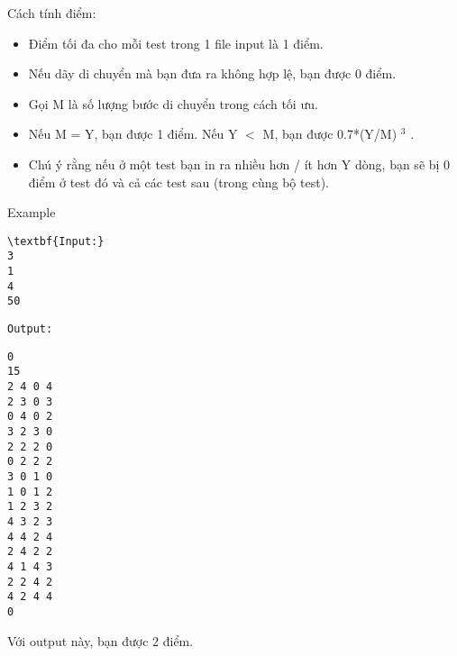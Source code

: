 Cách tính điểm:  
\begin{itemize}
	\item     Điểm tối đa cho mỗi test trong 1 file input là 1 điểm.   
	\item     Nếu dãy di chuyển mà bạn đưa ra không hợp lệ, bạn được 0 điểm.   
	\item     Gọi M là số lượng bước di chuyển trong cách tối ưu.   
	\item     Nếu M = Y, bạn được 1 điểm. Nếu Y $<$ M, bạn được 0.7*(Y/M)    $^     3    $    .   
	\item     Chú ý rằng nếu ở một test bạn in ra nhiều hơn / ít hơn Y dòng, bạn sẽ bị 0 điểm ở test đó và cả các test sau (trong cùng bộ test).   
\end{itemize}
   Example  
\begin{verbatim}
\textbf{Input:}
3
1
4
50
\end{verbatim}
\begin{verbatim}
Output:\end{verbatim}
\begin{verbatim}
0
15
2 4 0 4
2 3 0 3
0 4 0 2
3 2 3 0
2 2 2 0
0 2 2 2
3 0 1 0
1 0 1 2
1 2 3 2
4 3 2 3
4 4 2 4
2 4 2 2
4 1 4 3
2 2 4 2
4 2 4 4
0
\end{verbatim}

   Với output này, bạn được 2 điểm.